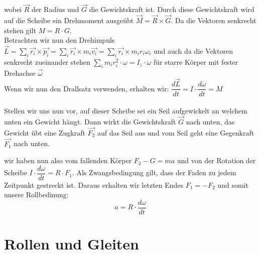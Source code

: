 \documentclass[12pt]{article}
\begin{document}
\begin{figure}[H]
  \label{fig:1teil}
\end{figure} 
 wobei $\vec{R}$ der Radius und $\vec{G}$ die Gewichtskraft ist. Durch diese Gewichtskraft wird auf die Scheibe ein Drehmoment ausgeübt $\vec{M} = \vec{R} \times \vec{G}$. Da die Vektoren senkrecht stehen gilt $M = R \cdot G$.\\
 Betrachten wir nun den Drehimpuls $\vec{L} = \sum_{i} \vec{r_i} \times \vec{p_i} = \sum_{i} \vec{r_i} \times m_i \vec{v_i} = \sum_{i} \vec{r_i} \times m_i r_i \omega_i$ und auch da die Vektoren senkrecht zueinander stehen $\sum_{i} m_i r_i^2 \cdot \omega = I_z \cdot \omega$ für starre Körper mit fester Drehachse $\vec{\omega}$\\
 Wenn wir nun den Drallsatz verwenden, erhalten wir: $\dfrac{d \vec{L}}{dt} = I \cdot \dfrac{d \omega}{dt} = M$
\\
\\
Stellen wir uns nun vor, auf dieser Scheibe sei ein Seil aufgewickelt an welchem unten ein Gewicht hängt. Dann wirkt die Gewichtskraft $\vec{G}$ nach unten, das Gewicht übt eine Zugkraft $\vec{F_2}$ auf das Seil aus und vom Seil geht eine Gegenkraft $\vec{F_1}$ nach unten.

\begin{figure}[H]
  \label{fig:1teil}
\end{figure} 
wir haben nun also vom fallenden Körper $ F_2 - G = ma$ und von der Rotation der Scheibe $ I \cdot \dfrac{d\omega}{dt} = R \cdot F_1$. Als Zwangsbedingung gilt, dass der Faden zu jedem Zeitpunkt gestreckt ist. Daraus erhalten wir letzten Endes $F_1 = -F_2$ und somit unsere Rollbedinung:
\begin{equation}
a = R \cdot \dfrac{d\omega}{dt}
\end{equation}

\section{Rollen und Gleiten}

\begin{figure}[H]
  \label{fig:1teil}
\end{figure} 
\end{document}
